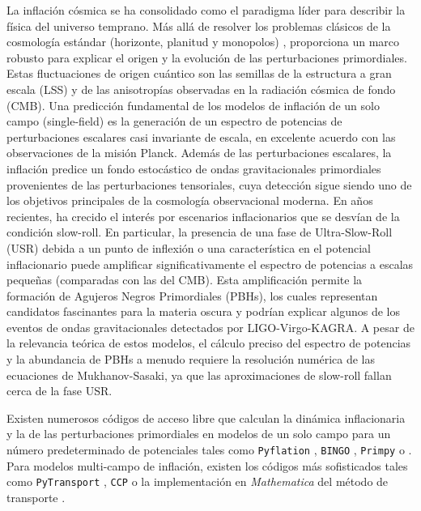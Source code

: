 \documentclass{SciPost}
\begin{document}


La inflación cósmica se ha consolidado como el paradigma líder para describir la física del universo temprano. Más allá de resolver los problemas clásicos de la cosmología estándar (horizonte, planitud y monopolos) \cite{guth1981,Linde1982,starobinsky1980}, proporciona un marco robusto para explicar el origen y la evolución de las perturbaciones primordiales. Estas fluctuaciones de origen cuántico son las semillas de la estructura a gran escala (LSS) y de las anisotropías observadas en la radiación cósmica de fondo (CMB).
Una predicción fundamental de los modelos de inflación de un solo campo (single-field) es la generación de un espectro de potencias de perturbaciones escalares casi invariante de escala, en excelente acuerdo con las observaciones de la misión Planck. Además de las perturbaciones escalares, la inflación predice un fondo estocástico de ondas gravitacionales primordiales provenientes de las perturbaciones tensoriales\cite{Starobinsky_1979,varun1990}, cuya detección sigue siendo uno de los objetivos principales de la cosmología observacional moderna. En años recientes, ha crecido el interés por escenarios inflacionarios que se desvían de la condición slow-roll. En particular, la presencia de una fase de Ultra-Slow-Roll (USR) debida a un punto de inflexión o una característica en el potencial inflacionario puede amplificar significativamente el espectro de potencias a escalas pequeñas (comparadas con las del CMB). Esta amplificación permite la formación de Agujeros Negros Primordiales (PBHs), los cuales representan candidatos fascinantes para la materia oscura y podrían explicar algunos de los eventos de ondas gravitacionales detectados por LIGO-Virgo-KAGRA. A pesar de la relevancia teórica de estos modelos, el cálculo preciso del espectro de potencias y la abundancia de PBHs a menudo requiere la resolución numérica de las ecuaciones de Mukhanov-Sasaki, ya que las aproximaciones de slow-roll fallan cerca de la fase USR. 

Existen numerosos códigos de acceso libre que calculan la dinámica inflacionaria y la de las perturbaciones primordiales en modelos de un solo campo para un número predeterminado de potenciales tales como \texttt{Pyflation} \cite{Huston_2009}, \texttt{BINGO} \cite{Hazra2013}, \texttt{Primpy} \cite{Hergt2022} o \cite{Siddharth2024}. Para modelos multi-campo de inflación, existen los códigos más sofisticados tales como  \texttt{PyTransport} \cite{}, \texttt{CCP} o la implementación en \textit{Mathematica} del método de transporte .
\end{document}
